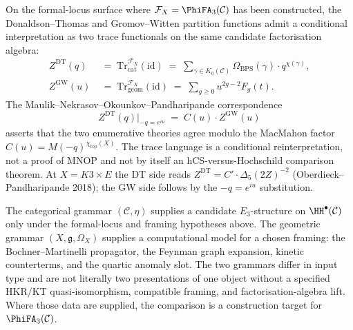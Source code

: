 \begin{theorem}
\label{thm:DT-GW-MNOP-treatise}
On the formal-locus surface where $\mathcal{F}_X=\PhiFA_3(\mathcal{C})$
has been constructed, the Donaldson--Thomas and Gromov--Witten
partition functions admit a conditional interpretation as two trace
functionals on the same candidate factorisation algebra:
\begin{align*}
Z^{\mathrm{DT}}(q) \;&=\; \mathrm{Tr}^{\mathcal{F}_X}_{\mathrm{cat}} (\mathrm{id}) \;=\; \sum_{\gamma \in K_0(\mathcal{C})} \Omega_{\mathrm{BPS}}(\gamma) \cdot q^{\chi(\gamma)}, \\
Z^{\mathrm{GW}}(u) \;&=\; \mathrm{Tr}^{\mathcal{F}_X}_{\mathrm{geom}} (\mathrm{id}) \;=\; \sum_{g \geq 0} u^{2g - 2} F_g(t).
\end{align*}
The Maulik--Nekrasov--Okounkov--Pandharipande correspondence
\[
Z^{\mathrm{DT}}(q) \big|_{-q = e^{i u}} \;=\; C(u) \cdot Z^{\mathrm{GW}}(u)
\]
asserts that the two enumerative theories agree modulo the MacMahon
factor $C(u)=M(-q)^{\chi_{\mathrm{top}}(X)}$.  The trace language is a
conditional reinterpretation, not a proof of MNOP and not by itself an
hCS-versus-Hochschild comparison theorem.  At $X=K3\times E$ the DT side
reads $Z^{\mathrm{DT}}=C'\cdot\Delta_5(2Z)^{-2}$
(Oberdieck--Pandharipande 2018); the GW side follows by the
$-q=e^{iu}$ substitution.
\end{theorem}

\begin{corollary}
\label{cor:hcs-geometric-resolution-treatise}
The categorical grammar $(\mathcal{C},\eta)$ supplies a candidate
$E_3$-structure on $\HH^\bullet(\mathcal{C})$ only under the
formal-locus and framing hypotheses above.  The geometric grammar
$(X,\mathfrak g,\Omega_X)$ supplies a computational model for a chosen
framing: the Bochner--Martinelli propagator, the Feynman graph expansion,
kinetic counterterms, and the quartic anomaly slot.  The
two grammars differ in input type and are not literally two
presentations of one object without a specified HKR/KT quasi-isomorphism,
compatible framing, and factorisation-algebra lift.  Where those data
are supplied, the comparison is a construction target for
$\PhiFA_3(\mathcal C)$.
\end{corollary}

